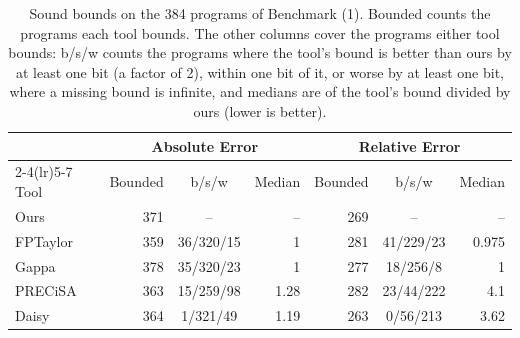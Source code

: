 \begin{table}[H] \centering \small
\caption{Sound bounds on the 384 programs of Benchmark (1). Bounded counts the programs each tool bounds. The other columns cover the programs either tool bounds: b/s/w counts the programs where the tool's bound is better than ours by at least one bit (a factor of 2), within one bit of it, or worse by at least one bit, where a missing bound is infinite, and medians are of the tool's bound divided by ours (lower is better).}\label{tab:tightness}
\begin{tabular}{lrcrrcr}
\toprule
& \multicolumn{3}{c}{Absolute Error} & \multicolumn{3}{c}{Relative Error} \\
\cmidrule(lr){2-4}\cmidrule(lr){5-7}
Tool & Bounded & b/s/w & Median & Bounded & b/s/w & Median \\
\midrule
Ours & 371 & -- & -- & 269 & -- & -- \\
FPTaylor & 359 & 36/320/15 & 1 & 281 & 41/229/23 & 0.975 \\
Gappa & 378 & 35/320/23 & 1 & 277 & 18/256/8 & 1 \\
PRECiSA & 363 & 15/259/98 & 1.28 & 282 & 23/44/222 & 4.1 \\
Daisy & 364 & 1/321/49 & 1.19 & 263 & 0/56/213 & 3.62 \\
\bottomrule
\end{tabular}
\end{table}
